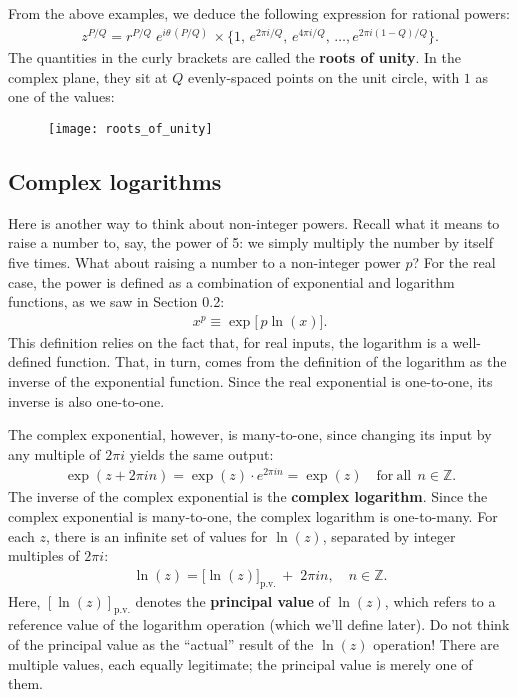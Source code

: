 \documentclass[10pt,a4paper]{article}
\begin{document}
\vskip 0.2in

From the above examples, we deduce the following expression for rational powers:
\begin{align}
  z^{P/Q} = r^{P/Q} \; e^{i\theta\, (P/Q)}\, \times \Big\{1,\, e^{2\pi i /Q},\, e^{4\pi i /Q},\, \dots, e^{2\pi i (1-Q)/Q} \Big\}.
\end{align}
The quantities in the curly brackets are called the \textbf{roots of
  unity}. In the complex plane, they sit at $Q$ evenly-spaced points
on the unit circle, with $1$ as one of the values:

\vskip 0.2in
\begin{figure}[ht]
  \centering\texttt{[image: roots\_of\_unity]}
\end{figure}

\clearpage

\subsection{Complex logarithms}\label{complex-logarithms}

Here is another way to think about non-integer powers.  Recall what it
means to raise a number to, say, the power of 5: we simply multiply
the number by itself five times.  What about raising a number to a
non-integer power $p$?  For the real case, the power is defined as a
combination of exponential and logarithm functions, as we saw in
Section 0.2:
\begin{align}
  x^p \equiv \exp\!\big[\,p\ln(x)\big].
\end{align}
This definition relies on the fact that, for real inputs, the
logarithm is a well-defined function.  That, in turn, comes from the
definition of the logarithm as the inverse of the exponential
function. Since the real exponential is one-to-one, its inverse is
also one-to-one.

The complex exponential, however, is many-to-one, since changing its
input by any multiple of $2\pi i$ yields the same output:
\begin{align}
  \exp(z + 2\pi i n) = \exp(z) \cdot e^{2\pi i n} = \exp(z) \quad \mathrm{for~all}\;\, n \in \mathbb{Z}.
\end{align}
The inverse of the complex exponential is the \textbf{complex
  logarithm}. Since the complex exponential is many-to-one, the
complex logarithm is one-to-many.  For each $z$, there is an infinite
set of values for $\ln(z)$, separated by integer multiples of $2\pi
i$:
\begin{align}
  \ln(z) = \big[\ln(z)\big]_{\mathrm{p.v.}}\, +\; 2 \pi i n, \quad n \in \mathbb{Z}.
\end{align}
Here, $[\ln(z)]_{\mathrm{p.v.}}$ denotes the \textbf{principal value}
of $\ln(z)$, which refers to a reference value of the logarithm
operation (which we'll define later).  Do not think of the principal
value as the ``actual'' result of the $\ln(z)$ operation! There are
multiple values, each equally legitimate; the principal value is
merely one of them.
\end{document}
